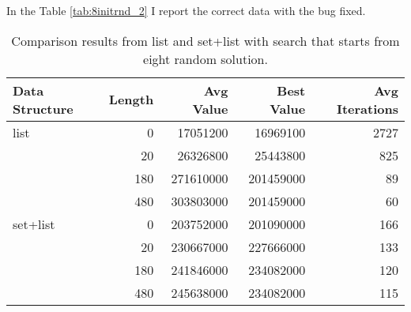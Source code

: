 \documentclass[]{article}
\begin{document}
	In the Table \ref{tab:8initrnd_2} I report the correct data with the bug fixed.
	
	\begin{table}[]
		\centering
		\begin{tabular}{lrrrr}
			\toprule
			\textbf{Data Structure} & \textbf{Length} & \textbf{Avg Value} & \textbf{Best Value} & \textbf{Avg Iterations} \\
			\midrule
			list                    & 0               & 17051200           & 16969100            & 2727                    \\
			& 20              & 26326800           & 25443800            & 825                     \\
			& 180             & 271610000          & 201459000           & 89                      \\
			& 480             & 303803000          & 201459000           & 60                      \\
			\midrule
			set+list                & 0               & 203752000          & 201090000           & 166                     \\
			& 20              & 230667000          & 227666000           & 133                     \\
			& 180             & 241846000          & 234082000           & 120                     \\
			& 480             & 245638000          & 234082000           & 115   \\
			\bottomrule                 
		\end{tabular}
		\caption{Comparison results from list and set+list with search that starts from eight random solution.}
		\label{tab:8initrnd_1}
	\end{table}
\end{document}
